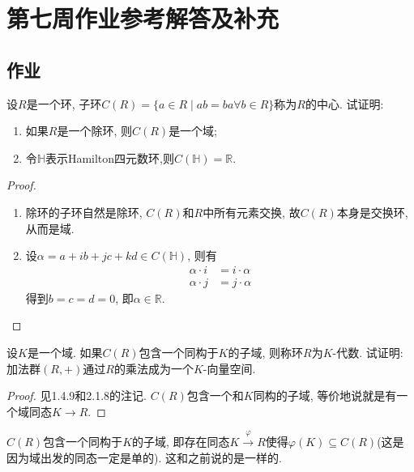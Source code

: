 \documentclass{../solutions-cn}
\begin{document}
\section*{第七周作业参考解答及补充}

\subsection*{作业}

\begin{exercise}[习题2.1.11]
    设$R$是一个环, 子环$C(R) = \{a \in R \mid ab = ba \forall b \in R\}$称为$R$的中心. 试证明:
    \begin{enumerate}[(1)]
        \item 如果$R$是一个除环, 则$C(R)$是一个域;
        \item 令$\mathbb{H}$表示Hamilton四元数环,则$C(\mathbb{H}) = \mathbb{R}$.
    \end{enumerate}
\end{exercise}

\begin{proof}
    \begin{enumerate}[(1)]
        \item 除环的子环自然是除环, $C(R)$和$R$中所有元素交换, 故$C(R)$本身是交换环, 从而是域.
        \item 设$\alpha = a + ib + jc + kd \in C(\mathbb{H})$, 则有
        \[
        \begin{aligned}
            \alpha \cdot i &= i \cdot \alpha\\
            \alpha \cdot j &= j \cdot \alpha
        \end{aligned}
        \]
        得到$b = c = d = 0$, 即$\alpha \in \mathbb{R}$.
    \end{enumerate}
\end{proof}

\begin{exercise}[习题2.1.12]
    设$K$是一个域. 如果$C(R)$包含一个同构于$K$的子域, 则称环$R$为$K$-代数. 试证明: 加法群$(R, +)$通过$R$的乘法成为一个$K$-向量空间.
\end{exercise}

\begin{proof}
    见1.4.9和2.1.8的注记. $C(R)$包含一个和$K$同构的子域, 等价地说就是有一个域同态$K \to R$.
\end{proof}

\begin{remark}
    $C(R)$包含一个同构于$K$的子域, 即存在同态$K \overset{\varphi}\to R$使得$\varphi(K) \subseteq C(R)$(这是因为域出发的同态一定是单的). 这和之前说的是一样的.
\end{remark}
\end{document}
